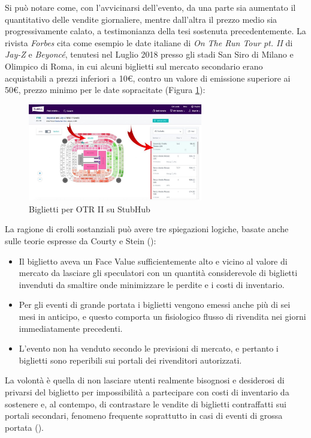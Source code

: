 Si può notare come, con l'avvicinarsi dell'evento, da una parte sia aumentato il quantitativo delle vendite giornaliere, mentre dall'altra il prezzo medio sia progressivamente calato, a testimonianza della tesi sostenuta precedentemente. 
La rivista \textit{Forbes} cita come esempio le date italiane di \textit{On The Run Tour pt. II} di \textit{Jay-Z} e \textit{Beyoncé}, tenutesi nel Luglio 2018 presso gli stadi San Siro di Milano e Olimpico di Roma, in cui alcuni biglietti sul mercato secondario erano acquistabili a prezzi inferiori a 10€, contro un valore di emissione superiore ai 50€, prezzo minimo per le date sopracitate (Figura \ref{jayz}):
\begin{figure}[H]
	\centering
	\includegraphics[width=0.68\textwidth]{chapter4/immagini/beyonce_jay_z}
	\caption{Biglietti per OTR II su StubHub}
	\label{jayz}
\end{figure}
La ragione di crolli sostanziali può avere tre spiegazioni logiche, basate anche sulle teorie espresse da Courty e Stein (\cite{courty2014pricing, stein2014will}):
\begin{itemize}
\item Il biglietto aveva un Face Value sufficientemente alto e vicino al valore di mercato da lasciare gli speculatori con un quantità considerevole di biglietti invenduti da smaltire onde minimizzare le perdite e i costi di inventario.
\item Per gli eventi di grande portata i biglietti vengono emessi anche più di sei mesi in anticipo, e questo comporta un fisiologico flusso di rivendita nei giorni immediatamente precedenti. 
\item L'evento non ha venduto secondo le previsioni di mercato, e pertanto i biglietti sono reperibili sui portali dei rivenditori autorizzati. 
\end{itemize}
La volontà è quella di non lasciare utenti realmente bisognosi e desiderosi di privarsi del biglietto per impossibilità a partecipare con costi di inventario da sostenere e, al contempo, di contrastare le vendite di biglietti contraffatti sui portali secondari, fenomeno frequente soprattutto in casi di eventi di grossa portata (\cite{phdthesis}).
